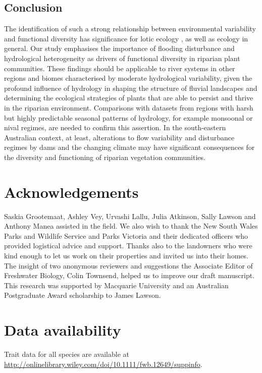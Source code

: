 \documentclass[openright,12pt,a4paper]{memoir}
\begin{document}
\subsection*{Conclusion}
 
The identification of such a strong relationship between environmental variability and functional diversity has significance for lotic ecology \citep{Palmer1997}, as well as ecology in general. Our study emphasises the importance of flooding disturbance and hydrological heterogeneity as drivers of functional diversity in riparian plant communities. These findings should be applicable to river systems in other regions and biomes characterised by moderate hydrological variability, given the profound influence of hydrology in shaping the structure of fluvial landscapes and determining the ecological strategies of plants that are able to persist and thrive in the riparian environment. Comparisons with datasets from regions with harsh but highly predictable seasonal patterns of hydrology, for example monsoonal or nival regimes, are needed to confirm this assertion. In the south-eastern Australian context, at least, alterations to flow variability and disturbance regimes by dams and the changing climate may have significant consequences for the diversity and functioning of riparian vegetation communities.

\section*{Acknowledgements}
Saskia Grootemaat, Ashley Vey, Urvashi Lallu, Julia Atkinson, Sally Lawson and Anthony Manea assisted in the field. We also wish to thank the New South Wales Parks and Wildlife Service and Parks Victoria and their dedicated officers who provided logistical advice and support. Thanks also to the landowners who were kind enough to let us work on their properties and invited us into their homes. The insight of two anonymous reviewers and suggestions the Associate Editor of Freshwater Biology, Colin Townsend, helped us to improve our draft manuscript. This research was supported by Macquarie University and an Australian Postgraduate Award scholarship to James Lawson.

\section*{Data availability}
Trait data for all species are available at \url{http://onlinelibrary.wiley.com/doi/10.1111/fwb.12649/suppinfo}.

\clearpage

\renewcommand\bibname{{References}} 
\begin{small}


\end{small}
\end{document}
